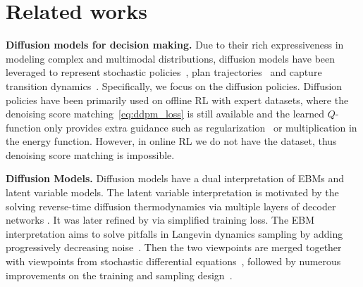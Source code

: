 \section{Related works}
\label{sec:apdx_related_works}

\textbf{Diffusion models for decision making.} Due to their rich expressiveness in modeling complex and multimodal distributions, diffusion models have been leveraged to represent stochastic policies~\cite{wang2022diffusion,chen2022offline,hansen2023idql}, plan trajectories~\cite{janner2022planning,chi2023diffusion,du2024learning} and capture transition dynamics~\cite{rigter2023world,ding2024diffusionworldmodel,shribak2024diffusion}. Specifically, we focus on the diffusion policies. Diffusion policies have been primarily used on offline RL with expert datasets, where the denoising score matching~\eqref{eq:ddpm_loss} is still available and the learned $Q$-function only provides extra guidance such as regularization~\cite{wang2022diffusion} or multiplication in the energy function.
However, in online RL we do not have the dataset, thus denoising score matching is impossible.

\textbf{Diffusion Models.}
Diffusion models have a dual interpretation of EBMs and latent variable models. The latent variable interpretation is motivated by the solving reverse-time diffusion thermodynamics via multiple layers of decoder networks \cite{sohl-dickstein2015deep}. It was later refined by \citet{ho2020denoising} via simplified training loss. The EBM interpretation aims to solve pitfalls in Langevin dynamics sampling by adding progressively decreasing noise~\cite{song2019generative}. Then the two viewpoints are merged together with viewpoints from stochastic differential equations~\cite{song2021scorebased}, followed by numerous improvements on the training and sampling design~\cite{song2022denoising,karras2022elucidating}.


